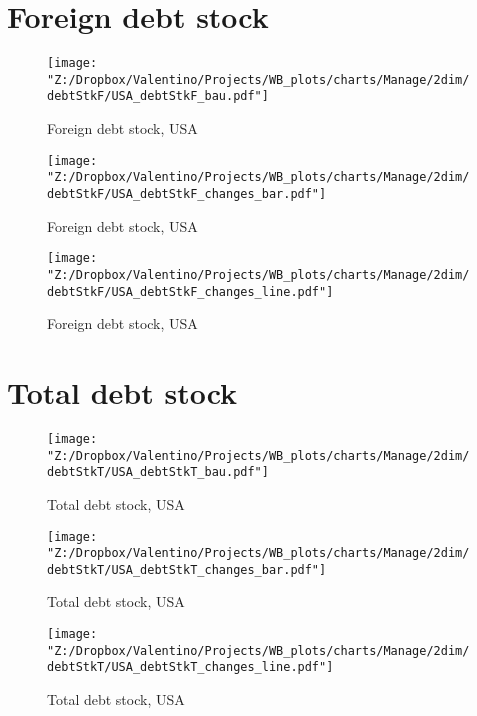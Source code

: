 \documentclass[12pt, letterpaper]{article}
\begin{document}
\section{Foreign debt stock}
\begin{figure}[H]
\caption{Foreign debt stock, USA}
\label{fig_USA_debtStkF_bau}
\centering
\texttt{[image: "Z:/Dropbox/Valentino/Projects/WB\_plots/charts/Manage/2dim/debtStkF/USA\_debtStkF\_bau.pdf"]}
\end{figure}
\begin{figure}[H]
\caption{Foreign debt stock, USA}
\label{fig_USA_debtStkF_changes_bar}
\centering
\texttt{[image: "Z:/Dropbox/Valentino/Projects/WB\_plots/charts/Manage/2dim/debtStkF/USA\_debtStkF\_changes\_bar.pdf"]}
\end{figure}
\begin{figure}[H]
\caption{Foreign debt stock, USA}
\label{fig_USA_debtStkF_changes_line}
\centering
\texttt{[image: "Z:/Dropbox/Valentino/Projects/WB\_plots/charts/Manage/2dim/debtStkF/USA\_debtStkF\_changes\_line.pdf"]}
\end{figure}

\newpage
\section{Total debt stock}
\begin{figure}[H]
\caption{Total debt stock, USA}
\label{fig_USA_debtStkT_bau}
\centering
\texttt{[image: "Z:/Dropbox/Valentino/Projects/WB\_plots/charts/Manage/2dim/debtStkT/USA\_debtStkT\_bau.pdf"]}
\end{figure}
\begin{figure}[H]
\caption{Total debt stock, USA}
\label{fig_USA_debtStkT_changes_bar}
\centering
\texttt{[image: "Z:/Dropbox/Valentino/Projects/WB\_plots/charts/Manage/2dim/debtStkT/USA\_debtStkT\_changes\_bar.pdf"]}
\end{figure}
\begin{figure}[H]
\caption{Total debt stock, USA}
\label{fig_USA_debtStkT_changes_line}
\centering
\texttt{[image: "Z:/Dropbox/Valentino/Projects/WB\_plots/charts/Manage/2dim/debtStkT/USA\_debtStkT\_changes\_line.pdf"]}
\end{figure}
\end{document}
